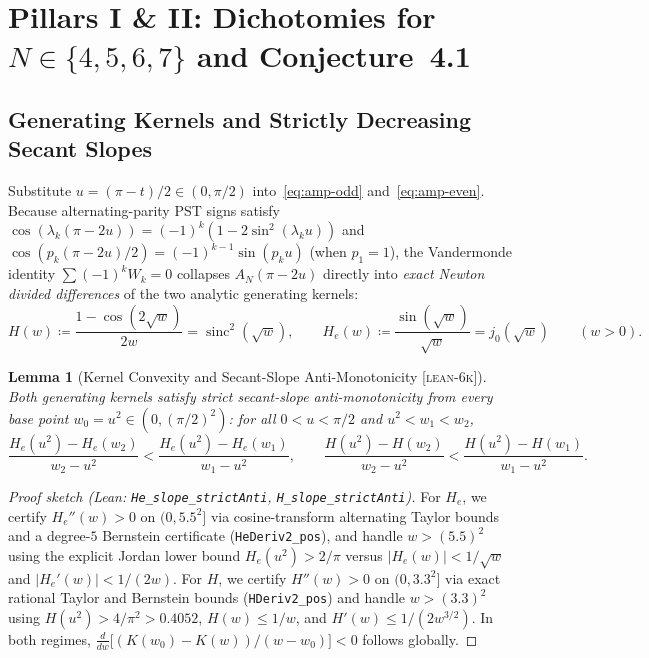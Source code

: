 \documentclass[11pt,reqno]{amsart}
\newtheorem{lemma}[theorem]{Lemma}
\theoremstyle{definition}
\newcommand{\sinc}{\operatorname{sinc}}
\newcommand{\taglean}{\textsc{[lean-6k]}}
\newcommand{\id}[1]{\textnormal{\texttt{\small #1}}}
\begin{document}
\section{Pillars I \& II: Dichotomies for \texorpdfstring{$N\in\{4,5,6,7\}$}{N in {4,5,6,7}} and Conjecture~4.1}
\label{sec:conj41}

\subsection{Generating Kernels and Strictly Decreasing Secant Slopes}

Substitute $u=(\pi-t)/2\in(0,\pi/2)$ into~\eqref{eq:amp-odd} and~\eqref{eq:amp-even}. Because alternating-parity PST signs satisfy $\cos(\lambda_k(\pi-2u)) = (-1)^k(1-2\sin^2(\lambda_k u))$ and $\cos(p_k(\pi-2u)/2) = (-1)^{k-1}\sin(p_k u)$ (when $p_1=1$), the Vandermonde identity $\sum (-1)^k W_k=0$ collapses $A_N(\pi-2u)$ directly into \emph{exact Newton divided differences} of the two analytic generating kernels:
\begin{equation}
\label{eq:kernels}
H(w) \coloneqq \frac{1-\cos(2\sqrt{w})}{2w} = \sinc^2(\sqrt{w}), \qquad
H_e(w) \coloneqq \frac{\sin(\sqrt{w})}{\sqrt{w}} = j_0(\sqrt{w}) \qquad (w>0).
\end{equation}

\begin{lemma}[Kernel Convexity and Secant-Slope Anti-Monotonicity \taglean{}]
\label{lem:slopes}
Both generating kernels satisfy strict secant-slope anti-monotonicity from every base point $w_0=u^2\in(0,(\pi/2)^2)$: for all $0<u<\pi/2$ and $u^2<w_1<w_2$,
\begin{equation}
\frac{H_e(u^2)-H_e(w_2)}{w_2-u^2} < \frac{H_e(u^2)-H_e(w_1)}{w_1-u^2}, \qquad
\frac{H(u^2)-H(w_2)}{w_2-u^2} < \frac{H(u^2)-H(w_1)}{w_1-u^2}.
\end{equation}
\end{lemma}

\begin{proof}[Proof sketch (Lean: \id{He\_slope\_strictAnti}, \id{H\_slope\_strictAnti})]
For $H_e$, we certify $H_e''(w)>0$ on $(0,5.5^2]$ via cosine-transform alternating Taylor bounds and a degree-$5$ Bernstein certificate (\id{HeDeriv2\_pos}), and handle $w>(5.5)^2$ using the explicit Jordan lower bound $H_e(u^2)>2/\pi$ versus $|H_e(w)|<1/\sqrt{w}$ and $|H_e'(w)|<1/(2w)$. For $H$, we certify $H''(w)>0$ on $(0,3.3^2]$ via exact rational Taylor and Bernstein bounds (\id{HDeriv2\_pos}) and handle $w>(3.3)^2$ using $H(u^2)>4/\pi^2>0.4052$, $H(w)\le 1/w$, and $H'(w)\le 1/(2w^{3/2})$. In both regimes, $\frac{d}{dw}\big[(K(w_0)-K(w))/(w-w_0)\big]<0$ follows globally.
\end{proof}
\end{document}
